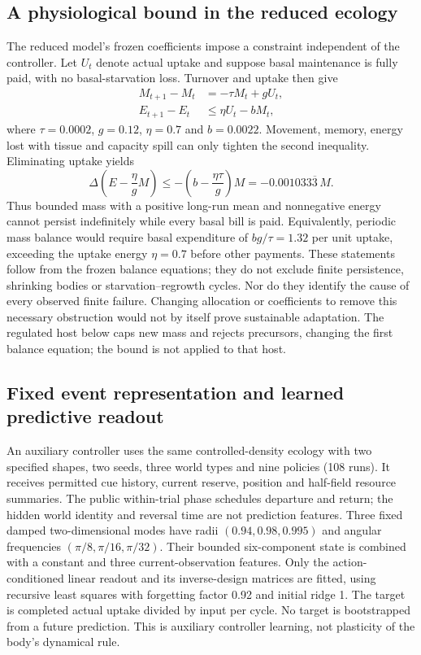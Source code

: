 \subsection*{A physiological bound in the reduced ecology}
The reduced model's frozen coefficients impose a constraint independent of the controller. Let $U_t$ denote actual uptake and suppose basal maintenance is fully paid, with no basal-starvation loss. Turnover and uptake then give
\begin{align}
M_{t+1}-M_t &= -\tau M_t+gU_t,\\
E_{t+1}-E_t &\leq \eta U_t-bM_t,
\end{align}
where $\tau=0.0002$, $g=0.12$, $\eta=0.7$ and $b=0.0022$. Movement, memory, energy lost with tissue and capacity spill can only tighten the second inequality. Eliminating uptake yields
\begin{equation}
\Delta\!\left(E-\frac{\eta}{g}M\right)
\leq -\left(b-\frac{\eta\tau}{g}\right)M
= -0.001033\overline{3}\,M.
\end{equation}
Thus bounded mass with a positive long-run mean and nonnegative energy cannot persist indefinitely while every basal bill is paid. Equivalently, periodic mass balance would require basal expenditure of $bg/\tau=1.32$ per unit uptake, exceeding the uptake energy $\eta=0.7$ before other payments. These statements follow from the frozen balance equations; they do not exclude finite persistence, shrinking bodies or starvation--regrowth cycles. Nor do they identify the cause of every observed finite failure. Changing allocation or coefficients to remove this necessary obstruction would not by itself prove sustainable adaptation. The regulated host below caps new mass and rejects precursors, changing the first balance equation; the bound is not applied to that host.

\subsection*{Fixed event representation and learned predictive readout}
An auxiliary controller uses the same controlled-density ecology with two specified shapes, two seeds, three world types and nine policies (108 runs). It receives permitted cue history, current reserve, position and half-field resource summaries. The public within-trial phase schedules departure and return; the hidden world identity and reversal time are not prediction features. Three fixed damped two-dimensional modes have radii $(0.94,0.98,0.995)$ and angular frequencies $(\pi/8,\pi/16,\pi/32)$. Their bounded six-component state is combined with a constant and three current-observation features. Only the action-conditioned linear readout and its inverse-design matrices are fitted, using recursive least squares with forgetting factor 0.92 and initial ridge 1. The target is completed actual uptake divided by input per cycle. No target is bootstrapped from a future prediction. This is auxiliary controller learning, not plasticity of the body's dynamical rule.

